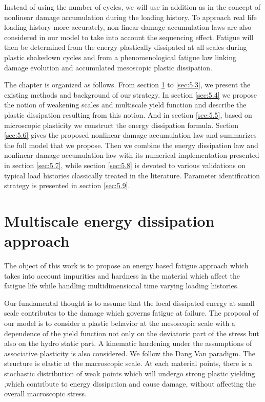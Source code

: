 Instead of using the number of cycles, we will use in addition as in \cite{lemaitre1999two} the concept of nonlinear damage accumulation during the loading history. To approach real life loading history more accurately, non-linear damage accumulation laws are also considered in our model to take into account the sequencing effect. Fatigue will then be determined from the energy plastically dissipated at all scales during plastic shakedown cycles and from a phenomenological fatigue law linking damage evolution and accumulated mesoscopic plastic dissipation.

The chapter is organized as follows. From section \ref{sec:5.1} to \ref{sec:5.3}, we present the existing methods and background of our strategy.  In section \ref{sec:5.4} we propose the notion of weakening scales and multiscale yield function and describe the plastic dissipation resulting from this notion. And in section \ref{sec:5.5}, based on microscopic plasticity we construct the energy dissipation formula. Section \ref{sec:5.6} gives the proposed nonlinear damage accumulation law and summarizes the full model that we propose. Then we combine the energy dissipation law and nonlinear damage accumulation law with its numerical implementation presented in section \ref{sec:5.7}, while section \ref{sec:5.8} is devoted to various validations on typical load histories classically treated in the literature. Parameter identification strategy is presented in section \ref{sec:5.9}.


\section{Multiscale energy dissipation approach}
\label{sec:5.1}
The object of this work is to propose an energy based fatigue approach which takes into account impurities and hardness in the material which affect the fatigue life while handling multidimensional time varying loading histories.

Our fundamental thought is to assume that the local dissipated energy at small scale contributes to the damage which governs fatigue at failure. The proposal of our model is to consider a plastic behavior at the mesoscopic scale with a dependence of the yield function not only on the deviatoric part of the stress but also on the hydro static part. A kinematic hardening under the assumptions of associative plasticity is also considered. We follow the Dang Van paradigm. The structure is elastic at the macroscopic scale. At each material points, there is a stochastic distribution of weak points which will undergo strong plastic yielding ,which contribute to energy dissipation and cause damage, without affecting the overall macroscopic stress.

